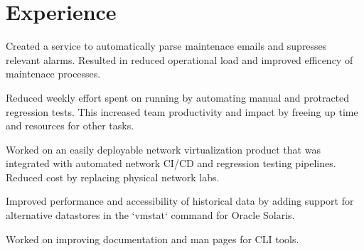 \documentclass[]{resume}
\begin{document}
\begin{minipage}[t]{0.70\textwidth}

\section{Experience}

\vspace{2pt}
\vspace{10pt}
\begin{tightemize}
\item  Created a service to automatically parse maintenace emails and supresses
relevant alarms. Resulted in reduced operational load and improved efficency
of maintenace processes.
\item Reduced weekly effort spent on running by automating manual and protracted regression tests.
This increased team productivity and impact by freeing up time and resources for other tasks.
\item Worked on an easily deployable network virtualization product that was integrated with
automated network CI/CD and regression testing pipelines. Reduced cost by replacing physical
network labs.
\end{tightemize}
\subsectionsep

\vspace{2pt}
\vspace{1pt}
\begin{tightemize}
\item Improved performance and accessibility of historical data by adding support for
alternative datastores in the `vmstat` command for Oracle Solaris.
\item Worked on improving documentation and man pages for CLI tools.
\end{tightemize}
\subsectionsep  %


\end{minipage}
\end{document}
